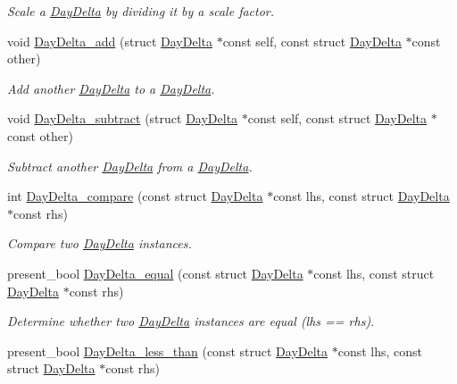 \begin{DoxyCompactItemize}
\begin{DoxyCompactList}\small\item\em \-Scale a \hyperlink{structDayDelta}{\-Day\-Delta} by dividing it by a scale factor. \end{DoxyCompactList}\item 
void \hyperlink{day-delta_8h_a1d879b02971a0c302622e56b577ceb23}{\-Day\-Delta\-\_\-add} (struct \hyperlink{structDayDelta}{\-Day\-Delta} $\ast$const self, const struct \hyperlink{structDayDelta}{\-Day\-Delta} $\ast$const other)
\begin{DoxyCompactList}\small\item\em \-Add another \hyperlink{structDayDelta}{\-Day\-Delta} to a \hyperlink{structDayDelta}{\-Day\-Delta}. \end{DoxyCompactList}\item 
void \hyperlink{day-delta_8h_a6fd32ca3c633ebe279df2a468fd1d91e}{\-Day\-Delta\-\_\-subtract} (struct \hyperlink{structDayDelta}{\-Day\-Delta} $\ast$const self, const struct \hyperlink{structDayDelta}{\-Day\-Delta} $\ast$const other)
\begin{DoxyCompactList}\small\item\em \-Subtract another \hyperlink{structDayDelta}{\-Day\-Delta} from a \hyperlink{structDayDelta}{\-Day\-Delta}. \end{DoxyCompactList}\item 
int \hyperlink{day-delta_8h_a9c2839c462e80f6419bb9e55f1744eab}{\-Day\-Delta\-\_\-compare} (const struct \hyperlink{structDayDelta}{\-Day\-Delta} $\ast$const lhs, const struct \hyperlink{structDayDelta}{\-Day\-Delta} $\ast$const rhs)
\begin{DoxyCompactList}\small\item\em \-Compare two \hyperlink{structDayDelta}{\-Day\-Delta} instances. \end{DoxyCompactList}\item 
present\-\_\-bool \hyperlink{day-delta_8h_aec7bbfd9ee83f64b94117028c4d856f5}{\-Day\-Delta\-\_\-equal} (const struct \hyperlink{structDayDelta}{\-Day\-Delta} $\ast$const lhs, const struct \hyperlink{structDayDelta}{\-Day\-Delta} $\ast$const rhs)
\begin{DoxyCompactList}\small\item\em \-Determine whether two \hyperlink{structDayDelta}{\-Day\-Delta} instances are equal (lhs == rhs). \end{DoxyCompactList}\item 
present\-\_\-bool \hyperlink{day-delta_8h_a47b5981aba0ded3368ade32fcf77e1fb}{\-Day\-Delta\-\_\-less\-\_\-than} (const struct \hyperlink{structDayDelta}{\-Day\-Delta} $\ast$const lhs, const struct \hyperlink{structDayDelta}{\-Day\-Delta} $\ast$const rhs)

\end{DoxyCompactItemize}
